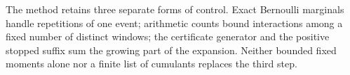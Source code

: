 The method retains three separate forms of control. Exact Bernoulli
marginals handle repetitions of one event; arithmetic counts bound
interactions among a fixed number of distinct windows; the certificate
generator and the positive stopped suffix sum the growing part of the
expansion. Neither bounded fixed moments alone nor a finite list of
cumulants replaces the third step.

